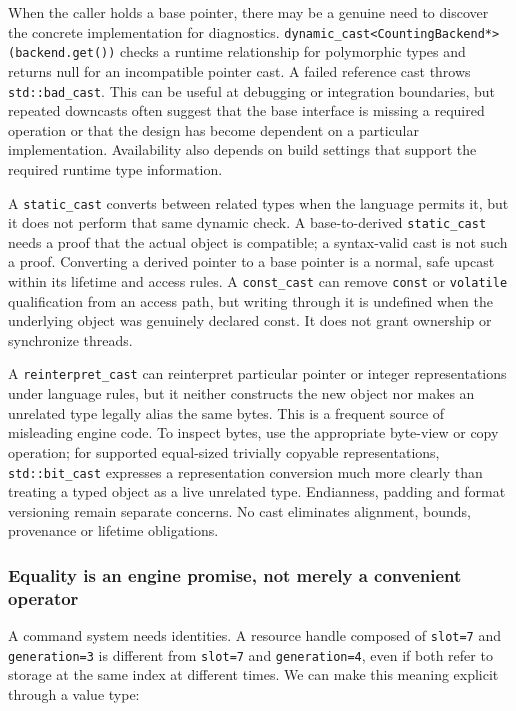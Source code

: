 When the caller holds a base pointer, there may be a genuine need to discover the concrete implementation for diagnostics. \texttt{dynamic\_cast\textless{}CountingBackend*\textgreater{}(backend.get())} checks a runtime relationship for polymorphic types and returns null for an incompatible pointer cast. A failed reference cast throws \texttt{std::bad\_cast}. This can be useful at debugging or integration boundaries, but repeated downcasts often suggest that the base interface is missing a required operation or that the design has become dependent on a particular implementation. Availability also depends on build settings that support the required runtime type information.

A \texttt{static\_cast} converts between related types when the language permits it, but it does not perform that same dynamic check. A base-to-derived \texttt{static\_cast} needs a proof that the actual object is compatible; a syntax-valid cast is not such a proof. Converting a derived pointer to a base pointer is a normal, safe upcast within its lifetime and access rules. A \texttt{const\_cast} can remove \texttt{const} or \texttt{volatile} qualification from an access path, but writing through it is undefined when the underlying object was genuinely declared const. It does not grant ownership or synchronize threads.

A \texttt{reinterpret\_cast} can reinterpret particular pointer or integer representations under language rules, but it neither constructs the new object nor makes an unrelated type legally alias the same bytes. This is a frequent source of misleading engine code. To inspect bytes, use the appropriate byte-view or copy operation; for supported equal-sized trivially copyable representations, \texttt{std::bit\_cast} expresses a representation conversion much more clearly than treating a typed object as a live unrelated type. Endianness, padding and format versioning remain separate concerns. No cast eliminates alignment, bounds, provenance or lifetime obligations.

\subsubsection{Equality is an engine promise, not merely a convenient operator}\label{equality-is-an-engine-promise-not-merely-a-convenient-operator}

A command system needs identities. A resource handle composed of \texttt{slot=7} and \texttt{generation=3} is different from \texttt{slot=7} and \texttt{generation=4}, even if both refer to storage at the same index at different times. We can make this meaning explicit through a value type:

